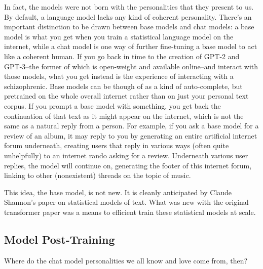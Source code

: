 In fact, the models were not born with the personalities that they present to
us. By default, a language model lacks any kind of coherent personality.
There's an important distinction to be drawn between base models and chat
models: a base model is what you get when you train a statistical language
model on the internet, while a chat model is one way of further fine-tuning a
base model to act like a coherent human. If you go back in time to the creation
of GPT-2 and GPT-3--the former of which is open-weight and available
online--and interact with those models, what you get instead is the experience
of interacting with a schizophrenic. Base models can be though of as a kind of
auto-complete, but pretrained on the whole overall internet rather than on just
your personal text corpus. If you prompt a base model with something, you get
back the continuation of that text as it might appear on the internet, which is
not the same as a natural reply from a person. For example, if you ask a base
model for a review of an album, it may reply to you by generating an entire
artificial internet forum underneath, creating users that reply in various ways
(often quite unhelpfully) to an internet rando asking for a review. Underneath
various user replies, the model will continue on, generating the footer of this
internet forum, linking to other (nonexistent) threads on the topic of music.

This idea, the base model, is not new. It is cleanly anticipated by Claude
Shannon's paper on statistical models of text. What was new with the original
transformer paper was a means to efficient train these statistical models at scale.

\subsection{Model Post-Training}
Where do the chat model personalities we all know and love come from, then?

\cite{askell2021assistant}
\cite{nostalgebraist2025void}

